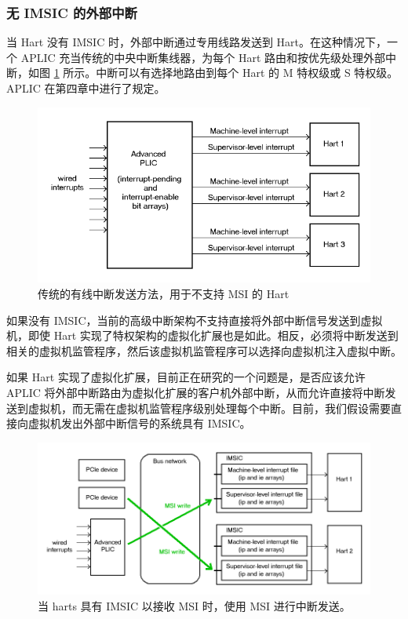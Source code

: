 \begin{translation}
\subsubsection{无 IMSIC 的外部中断}

当 {\RISCV} Hart 没有 IMSIC 时，外部中断通过专用线路发送到 Hart。在这种情况下，一个 APLIC 充当传统的中央中断集线器，为每个 Hart 路由和按优先级处理外部中断，如图 \ref{fig:intrsWithoutIMSICs} 所示。中断可以有选择地路由到每个 Hart 的 M 特权级或 S 特权级。APLIC 在第四章中进行了规定。

\begin{figure}[th]
    \centerline{\includegraphics[scale=0.55]{figures/intrsWithoutIMSICs.png}}
    \caption{传统的有线中断发送方法，用于不支持 MSI 的 Hart}
    \label{fig:intrsWithoutIMSICs}
\end{figure}

如果没有 IMSIC，当前的高级中断架构不支持直接将外部中断信号发送到虚拟机，即使 {\RISCV} Hart 实现了特权架构的虚拟化扩展也是如此。相反，必须将中断发送到相关的虚拟机监管程序，然后该虚拟机监管程序可以选择向虚拟机注入虚拟中断。

\begin{commentary}
    如果 Hart 实现了虚拟化扩展，目前正在研究的一个问题是，是否应该允许 APLIC 将外部中断路由为虚拟化扩展的客户机外部中断，从而允许直接将中断发送到虚拟机，而无需在虚拟机监管程序级别处理每个中断。目前，我们假设需要直接向虚拟机发出外部中断信号的系统具有 IMSIC。
\end{commentary}

\begin{figure}[th]
    \centerline{\includegraphics[scale=0.55]{figures/intrsWithIMSICs.png}}
    \caption{当 harts 具有 IMSIC 以接收 MSI 时，使用 MSI 进行中断发送。}
    \label{fig:intrsWithIMSICs}
\end{figure}


\end{translation}
